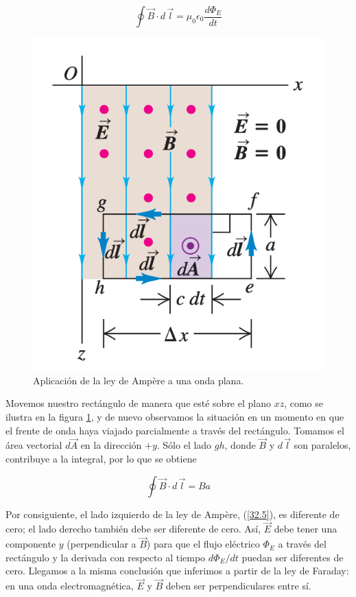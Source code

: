 \begin{equation}\label{32.5}
\oint\vec{B}\cdot d\,\vec{l}=\mu_0\epsilon_0\frac{d\Phi_E}{dt}
\end{equation}

\begin{figure}[h]
\centering
\includegraphics[scale=0.5]{fig/la}
\caption{Aplicación de la ley de Ampère
a una onda plana.}
\label{fig:la}
\end{figure}

Movemos nuestro rectángulo de manera que esté sobre el plano $xz$, como se ilustra en la figura \ref{fig:la}, y de nuevo observamos la situación en un momento en que el frente de onda haya viajado parcialmente a través del rectángulo. Tomamos el área vectorial $d\vec{A}$ en la dirección $+y$. Sólo el lado $gh$, donde $\vec{B}$ y $d\, \vec{l}$ son paralelos, contribuye a la integral, por lo que se obtiene

\begin{equation}\label{32.6}
\oint\vec{B}\cdot d\,\vec{l}=Ba
\end{equation}

Por consiguiente, el lado izquierdo de la ley de Ampère, (\ref{32.5}), es diferente de cero; el lado derecho también debe ser diferente de cero. Así, $\vec{E}$ debe tener una componente $y$ (perpendicular a $\vec{B}$) para que el flujo eléctrico $\Phi_E$ a través del rectángulo y la derivada con respecto al tiempo $d\Phi_E/dt$ puedan ser diferentes de cero. Llegamos
a la misma conclusión que inferimos a partir de la ley de Faraday: en una onda electromagnética, $\vec{E}$ y $\vec{B}$ deben ser perpendiculares entre sí.


